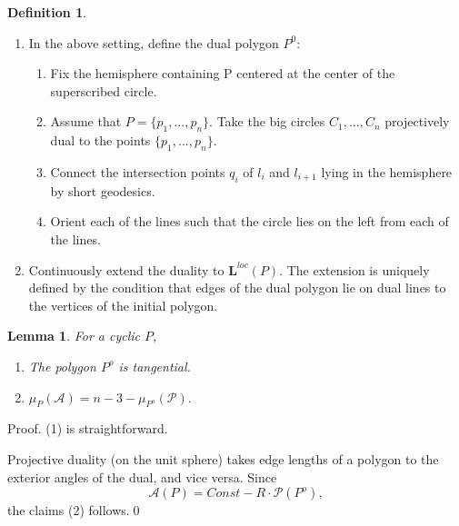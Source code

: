 \documentclass[12pt]{amsart}
\theoremstyle{plain}
\newtheorem{lemma}{Lemma}
\theoremstyle{definition}
\newtheorem{definition}{Definition}
\theoremstyle{remark}
\theoremstyle{plain}
\theoremstyle{definition}
\begin{document}
\begin{definition}
\begin{enumerate}
  \item In the above setting, define
the dual  polygon $P^0$:

\begin{enumerate}
\item Fix the hemisphere containing P centered at the center of the superscribed circle.
  \item Assume that $P=\{p_1,...,p_n\}$. Take the big circles $C_1,...,C_n$  projectively dual to the points $\{p_1,...,p_n\}$.
  \item Connect the intersection points $q_i$ of $l_i$ and $l_{i+1}$ lying in the hemisphere  by short geodesics.
  \item  Orient each of the lines such that the circle lies on the  {left} from each of the lines.
\end{enumerate}

  \item Continuously extend the duality to $\mathbf{L}^{loc}(P)  $. The extension  is uniquely defined by the condition that edges of the dual polygon lie on dual lines to the vertices of the initial polygon.
\end{enumerate}


\end{definition}
\begin{lemma}\label{LemmaRelAP}For a cyclic $P$,
  \begin{enumerate}
    \item The polygon $P^o$ is  tangential.
  \item \(\mu_{P}(\mathcal{A})=n-3-\mu_{P^o}(\mathcal{P}).\)

  \end{enumerate}
\end{lemma}
Proof. (1) is straightforward.

  Projective duality (on the unit sphere) takes edge lengths of a polygon to the exterior angles of the dual, and vice versa.
  Since
  $$\mathcal{A}(P)=Const -R\cdot \mathcal{P}(P^o),$$
  the claims (2) follows.\qed



\bigskip
\end{document}
